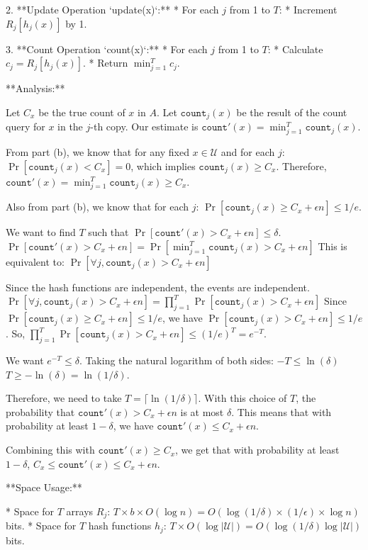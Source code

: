 \begin{enumerate}
\begin{shaded}
2.  **Update Operation `update(x)`:**
    * For each $j$ from 1 to $T$:
        * Increment $R_j[h_j(x)]$ by 1.

3.  **Count Operation `count(x)`:**
    * For each $j$ from 1 to $T$:
        * Calculate $c_j = R_j[h_j(x)]$.
    * Return $\min_{j=1}^T c_j$.

**Analysis:**

Let $C_x$ be the true count of $x$ in $A$. Let $\texttt{count}_j(x)$ be the result of the count query for $x$ in the $j$-th copy. Our estimate is $\texttt{count}'(x) = \min_{j=1}^T \texttt{count}_j(x)$.

From part (b), we know that for any fixed $x \in \mathcal{U}$ and for each $j$:
$\Pr[\texttt{count}_j(x) < C_x] = 0$, which implies $\texttt{count}_j(x) \ge C_x$.
Therefore, $\texttt{count}'(x) = \min_{j=1}^T \texttt{count}_j(x) \ge C_x$.

Also from part (b), we know that for each $j$:
$\Pr[\texttt{count}_j(x) \ge C_x + \epsilon n] \le 1/e$.

We want to find $T$ such that $\Pr[\texttt{count}'(x) > C_x + \epsilon n] \le \delta$.
$\Pr[\texttt{count}'(x) > C_x + \epsilon n] = \Pr[\min_{j=1}^T \texttt{count}_j(x) > C_x + \epsilon n]$
This is equivalent to:
$\Pr[\forall j, \texttt{count}_j(x) > C_x + \epsilon n]$

Since the hash functions are independent, the events are independent.
$\Pr[\forall j, \texttt{count}_j(x) > C_x + \epsilon n] = \prod_{j=1}^T \Pr[\texttt{count}_j(x) > C_x + \epsilon n]$
Since $\Pr[\texttt{count}_j(x) \ge C_x + \epsilon n] \le 1/e$, we have $\Pr[\texttt{count}_j(x) > C_x + \epsilon n] \le 1/e$.
So, $\prod_{j=1}^T \Pr[\texttt{count}_j(x) > C_x + \epsilon n] \le (1/e)^T = e^{-T}$.

We want $e^{-T} \le \delta$.
Taking the natural logarithm of both sides:
$-T \le \ln(\delta)$
$T \ge -\ln(\delta) = \ln(1/\delta)$.

Therefore, we need to take $T = \lceil \ln(1/\delta) \rceil$. With this choice of $T$, the probability that $\texttt{count}'(x) > C_x + \epsilon n$ is at most $\delta$.
This means that with probability at least $1 - \delta$, we have $\texttt{count}'(x) \le C_x + \epsilon n$.

Combining this with $\texttt{count}'(x) \ge C_x$, we get that with probability at least $1 - \delta$,
$C_x \le \texttt{count}'(x) \le C_x + \epsilon n$.

**Space Usage:**

* Space for $T$ arrays $R_j$: $T \times b \times O(\log n) = O(\log(1/\delta) \times (1/\epsilon) \times \log n)$ bits.
* Space for $T$ hash functions $h_j$: $T \times O(\log|\mathcal{U}|) = O(\log(1/\delta) \log|\mathcal{U}|)$ bits.


\end{shaded}
\end{enumerate}
